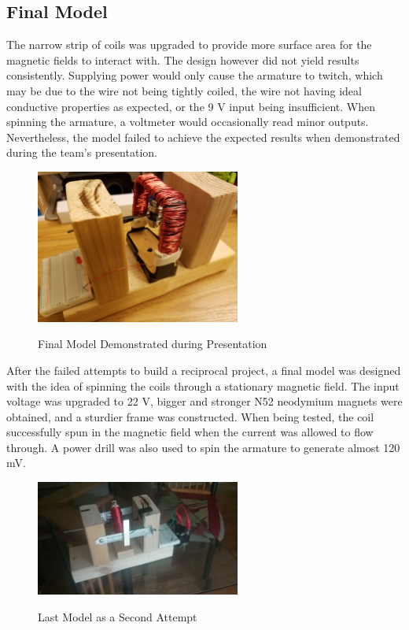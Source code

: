     \subsection{Final Model}
    The narrow strip of coils was upgraded to provide more surface area for the magnetic fields to interact with. The design however did not yield results consistently. Supplying power would only cause the armature to twitch, which may be due to the wire not being tightly coiled, the wire not having ideal conductive properties as expected, or the 9 V input being insufficient. When spinning the armature, a voltmeter would occasionally read minor outputs. Nevertheless, the model failed to achieve the expected results when demonstrated during the team's presentation.\\

    \begin{figure}[ht]
        \begin{center}
            \includegraphics[width=0.6\textwidth]{figures/models/5.jpg}
            \label{fig:model5}
        \end{center} \caption{Final Model Demonstrated during Presentation}
    \end{figure}

    \noindent
    After the failed attempts to build a reciprocal project, a final model was designed with the idea of spinning the coils through a stationary magnetic field. The input voltage was upgraded to 22 V, bigger and stronger N52 neodymium magnets were obtained, and a sturdier frame was constructed. When being tested, the coil successfully spun in the magnetic field when the current was allowed to flow through. A power drill was also used to spin the armature to generate almost 120 mV.\\

    \begin{figure}[ht]
        \begin{center}
            \includegraphics[width=0.6\textwidth]{figures/models/6.jpg}
            \label{fig:model6}
        \end{center} \caption{Last Model as a Second Attempt}
    \end{figure}

